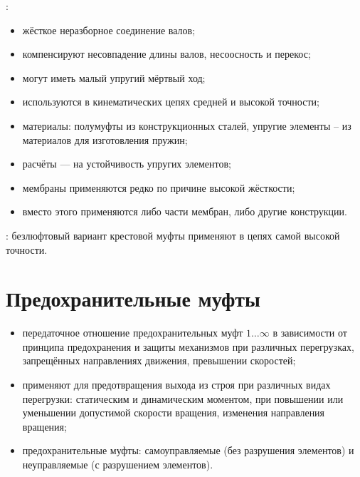 :
\begin{itemize}
	\item жёсткое неразборное соединение валов;
	\item компенсируют несовпадение длины валов, несоосность и перекос;
	\item могут иметь малый упругий мёртвый ход;
	\item используются в кинематических цепях средней и высокой точности;
	\item материалы: полумуфты из конструкционных сталей, упругие элементы – из материалов для изготовления пружин;
	\item расчёты --- на устойчивость упругих элементов;
	\item мембраны применяются редко по причине высокой жёсткости;
	\item вместо этого применяются либо части мембран, либо другие конструкции.
\end{itemize}

: безлюфтовый вариант крестовой муфты применяют в цепях самой высокой точности.

\section{Предохранительные муфты}
\begin{itemize}
	\item передаточное отношение предохранительных муфт $ 1\ldots \infty $ в зависимости от принципа предохранения и защиты механизмов при различных перегрузках, запрещённых направлениях движения, превышении скоростей;
	\item применяют для предотвращения выхода из строя при различных видах перегрузки: статическим и динамическим моментом, при повышении или уменьшении допустимой скорости вращения, изменения направления вращения;
	\item предохранительные муфты: самоуправляемые (без разрушения элементов) и неуправляемые (с разрушением элементов).
\end{itemize}


